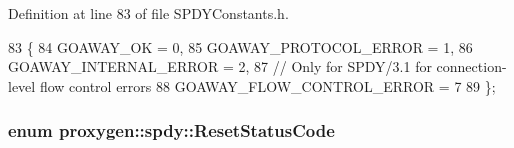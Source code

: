 Definition at line 83 of file S\+P\+D\+Y\+Constants.\+h.


\begin{DoxyCode}
83                       \{
84   GOAWAY_OK = 0,
85   GOAWAY_PROTOCOL_ERROR = 1,
86   GOAWAY_INTERNAL_ERROR = 2,
87   \textcolor{comment}{// Only for SPDY/3.1 for connection-level flow control errors}
88   GOAWAY_FLOW_CONTROL_ERROR = 7
89 \};
\end{DoxyCode}
\subsubsection[{Reset\+Status\+Code}]{\setlength{\rightskip}{0pt plus 5cm}enum {\bf proxygen\+::spdy\+::\+Reset\+Status\+Code}}\label{namespaceproxygen_1_1spdy_acad181927e2127ae4b608bbd2bed5f2f}
